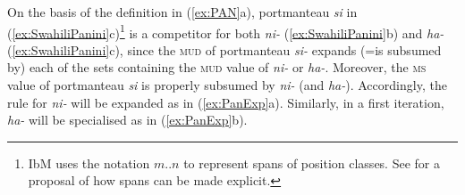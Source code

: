 \documentclass[output=paper
                ,modfonts
                ,nonflat
	        ,collection
	        ,collectionchapter
	        ,collectiontoclongg
 	        ,biblatex
                ,babelshorthands
                ,newtxmath
                ,draftmode
                ,colorlinks, citecolor=brown
] {langscibook}
\begin{document}
{\begin{exe}
\begin{minipage}[t]{0.4\linewidth} \begin{xlist}
    \end{xlist}
  \end{minipage}

\end{exe}

On the basis of the definition in (\ref{ex:PAN}a), portmanteau
\textit{si} in (\ref{ex:SwahiliPanini}c)\footnote{IbM uses the
  notation $m..n$ to represent spans of position classes. See
  \citet{bonami_o-crysmann_b13hpsg} for a proposal of how spans can be made explicit.} is a competitor for both
\textit{ni-} (\ref{ex:SwahiliPanini}b) and \textit{ha-}
(\ref{ex:SwahiliPanini}c), since the \textsc{mud} of portmanteau
\textit{si-} expands (=is subsumed by) each of the sets containing the \textsc{mud}
value of \textit{ni-} or \textit{ha-}. Moreover, the \textsc{ms} value
of portmanteau \textit{si} is properly subsumed by \textit{ni-} (and
\textit{ha-}). Accordingly, the rule for \textit{ni-} will be expanded
as in (\ref{ex:PanExp}a).  Similarly, in a first iteration,
\textit{ha-} will be specialised as in (\ref{ex:PanExp}b). 

}
\end{document}
